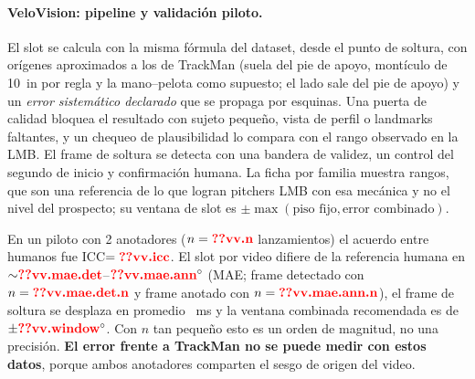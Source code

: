 \documentclass[10pt]{article}
\begin{document}
\paragraph{VeloVision: pipeline y validación piloto.} El slot se calcula con la misma fórmula del dataset, desde el punto de soltura, con orígenes aproximados a los de TrackMan (suela del pie de apoyo, montículo de 10~in por regla y la mano--pelota como supuesto; el lado sale del pie de apoyo) y un \emph{error sistemático declarado} que se propaga por esquinas. Una puerta de calidad bloquea el resultado con sujeto pequeño, vista de perfil o landmarks faltantes, y un chequeo de plausibilidad lo compara con el rango observado en la LMB. El frame de soltura se detecta con una bandera de validez, un control del segundo de inicio y confirmación humana. La ficha por familia muestra rangos, que son una referencia de lo que logran pitchers LMB con esa mecánica y no el nivel del prospecto; su ventana de slot es $\pm\max(\text{piso fijo},\text{error combinado})$.

En un piloto con 2 anotadores ($n=\cf{vv.n}$ lanzamientos) el acuerdo entre humanos fue ICC$=\cf{vv.icc}$. El slot por video difiere de la referencia humana en ${\sim}\cf{vv.mae.det}$--$\cf{vv.mae.ann}^\circ$ (MAE; frame detectado con $n=\cf{vv.mae.det.n}$ y frame anotado con $n=\cf{vv.mae.ann.n}$), el frame de soltura se desplaza en promedio ~ms y la ventana combinada recomendada es de $\pm\cf{vv.window}^\circ$. Con $n$ tan pequeño esto es un orden de magnitud, no una precisión. \textbf{El error frente a TrackMan no se puede medir con estos datos}, porque ambos anotadores comparten el sesgo de origen del video.
\end{document}

